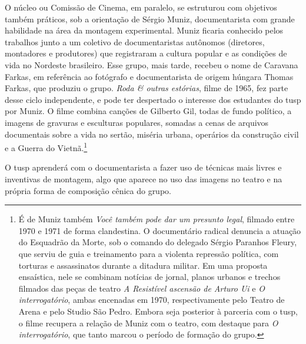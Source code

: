 
O núcleo ou Comissão de Cinema, em paralelo, se estruturou com objetivos
também práticos, sob a orientação de Sérgio Muniz, documentarista com
grande habilidade na área da montagem experimental. Muniz ficaria
conhecido pelos trabalhos junto a um coletivo de documentaristas
autônomos (diretores, montadores e produtores) que registraram a cultura
popular e as condições de vida no Nordeste brasileiro. Esse grupo, mais
tarde, recebeu o nome de Caravana Farkas, em referência ao fotógrafo e
documentarista de origem húngara Thomas Farkas, que produziu o grupo.
{\it Roda & outras estórias}, filme de 1965, fez parte desse ciclo
independente, e pode ter despertado o interesse dos estudantes do {\sc tusp}
por Muniz. O filme combina canções de Gilberto Gil, todas de fundo
político, a imagens de gravuras e esculturas populares, somadas a cenas
de arquivos documentais sobre a vida no sertão, miséria urbana,
operários da construção civil e a Guerra do Vietnã.\footnote{É de Muniz
  também {\it Você também pode dar um presunto legal}, filmado entre
  1970 e 1971 de forma clandestina. O documentário radical denuncia a
  atuação do Esquadrão da Morte, sob o comando do delegado Sérgio
  Paranhos Fleury, que serviu de guia e treinamento para a violenta
  repressão política, com torturas e assassinatos durante a ditadura
  militar. Em uma proposta ensaística, nele se combinam notícias de
  jornal, planos urbanos e trechos filmados das peças de teatro {\it A
  Resistível ascensão de Arturo Ui} e {\it O interrogatório}, ambas
  encenadas em 1970, respectivamente pelo Teatro de Arena e pelo Studio
  São Pedro. Embora seja posterior à parceria com o {\sc tusp}, o filme
  recupera a relação de Muniz com o teatro, com destaque para {\it O
  interrogatório}, que tanto marcou o período de formação do grupo.}

O {\sc tusp} aprenderá com o documentarista a fazer uso de técnicas mais
livres e inventivas de montagem, algo que aparece no uso das imagens no
teatro e na própria forma de composição cênica do grupo.



